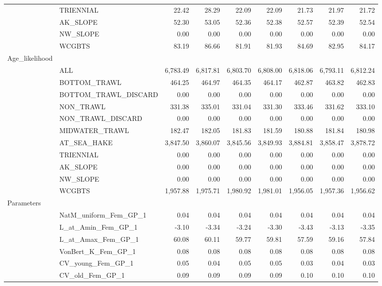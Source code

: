 \documentclass[
]{scrartcl}
\begin{document}
\begin{landscape}
\begin{longtable}{llrrrrrrr}
 & TRIENNIAL & 22.42 & 28.29 & 22.09 & 22.09 & 21.73 & 21.97 & 21.72 \\ 
 & AK\_SLOPE & 52.30 & 53.05 & 52.36 & 52.38 & 52.57 & 52.39 & 52.54 \\ 
 & NW\_SLOPE & 0.00 & 0.00 & 0.00 & 0.00 & 0.00 & 0.00 & 0.00 \\ 
 & WCGBTS & 83.19 & 86.66 & 81.91 & 81.93 & 84.69 & 82.95 & 84.17 \\ 
Age\_likelihood &  &  &  &  &  &  &  &  \\ 
 & ALL & 6,783.49 & 6,817.81 & 6,803.70 & 6,808.00 & 6,818.06 & 6,793.11 & 6,812.24 \\ 
 & BOTTOM\_TRAWL & 464.25 & 464.97 & 464.35 & 464.17 & 462.87 & 463.82 & 462.83 \\ 
 & BOTTOM\_TRAWL\_DISCARD & 0.00 & 0.00 & 0.00 & 0.00 & 0.00 & 0.00 & 0.00 \\ 
 & NON\_TRAWL & 331.38 & 335.01 & 331.04 & 331.30 & 333.46 & 331.62 & 333.10 \\ 
 & NON\_TRAWL\_DISCARD & 0.00 & 0.00 & 0.00 & 0.00 & 0.00 & 0.00 & 0.00 \\ 
 & MIDWATER\_TRAWL & 182.47 & 182.05 & 181.83 & 181.59 & 180.88 & 181.84 & 180.98 \\ 
 & AT\_SEA\_HAKE & 3,847.50 & 3,860.07 & 3,845.56 & 3,849.93 & 3,884.81 & 3,858.47 & 3,878.72 \\ 
 & TRIENNIAL & 0.00 & 0.00 & 0.00 & 0.00 & 0.00 & 0.00 & 0.00 \\ 
 & AK\_SLOPE & 0.00 & 0.00 & 0.00 & 0.00 & 0.00 & 0.00 & 0.00 \\ 
 & NW\_SLOPE & 0.00 & 0.00 & 0.00 & 0.00 & 0.00 & 0.00 & 0.00 \\ 
 & WCGBTS & 1,957.88 & 1,975.71 & 1,980.92 & 1,981.01 & 1,956.05 & 1,957.36 & 1,956.62 \\ 
Parameters &  &  &  &  &  &  &  &  \\ 
 & NatM\_uniform\_Fem\_GP\_1 & 0.04 & 0.04 & 0.04 & 0.04 & 0.04 & 0.04 & 0.04 \\ 
 & L\_at\_Amin\_Fem\_GP\_1 & -3.10 & -3.34 & -3.24 & -3.30 & -3.43 & -3.13 & -3.35 \\ 
 & L\_at\_Amax\_Fem\_GP\_1 & 60.08 & 60.11 & 59.77 & 59.81 & 57.59 & 59.16 & 57.84 \\ 
 & VonBert\_K\_Fem\_GP\_1 & 0.08 & 0.08 & 0.08 & 0.08 & 0.08 & 0.08 & 0.08 \\ 
 & CV\_young\_Fem\_GP\_1 & 0.05 & 0.04 & 0.05 & 0.05 & 0.03 & 0.04 & 0.03 \\ 
 & CV\_old\_Fem\_GP\_1 & 0.09 & 0.09 & 0.09 & 0.09 & 0.10 & 0.10 & 0.10 \\ 

\end{longtable}
\end{landscape}
\end{document}
